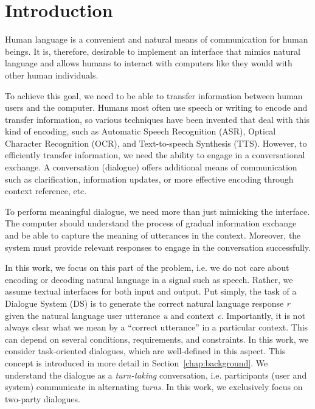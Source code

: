 \chapter{Introduction}%
\label{chap:intro}
Human language is a convenient and natural means of communication for human beings.
It is, therefore, desirable to implement an interface that mimics natural language and allows humans to interact with computers like they would with other human individuals.

To achieve this goal, we need to be able to transfer information between human users and the computer.
Humans most often use speech or writing to encode and transfer information, so various techniques have been invented that deal with this kind of encoding, such as Automatic Speech Recognition (ASR), Optical Character Recognition (OCR), and Text-to-speech Synthesis (TTS).
However, to efficiently transfer information, we need the ability to engage in a conversational exchange.
A conversation (dialogue) offers additional means of communication such as clarification, information updates, or more effective encoding through context reference, etc.

To perform meaningful dialogue, we need more than just mimicking the interface.
The computer should understand the process of gradual information exchange and be able to capture the meaning of utterances in the context.
Moreover, the system must provide relevant responses to engage in the conversation successfully\cite{jurafsky2000speech,mctear2022conversational}.

In this work, we focus on this part of the problem, i.e. we do not care about encoding or decoding natural language in a signal such as speech.
Rather, we assume textual interfaces for both input and output.
Put simply, the task of a Dialogue System (DS)\cite{jurafsky2000speech} is to generate the correct natural language response \textit{r} given the natural language user utterance \textit{u} and context \textit{c}.
Importantly, it is not always clear what we mean by a ``correct utterance'' in a particular context.
This can depend on several conditions, requirements, and constraints.
In this work, we consider task-oriented dialogues, which are well-defined in this aspect.
This concept is introduced in more detail in Section~\ref{chap:background}.
We understand the dialogue as a \textit{turn-taking} conversation, i.e. participants (user and system) communicate in alternating \textit{turns}.
In this work, we exclusively focus on two-party dialogues.

